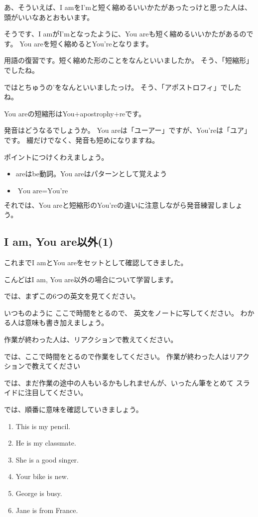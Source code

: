 \documentclass[book,jafontscale=0.9247]{jlreq}
\newcommand{\mySagyo}{%
\par%
\bigskip
では、ここで時間をとるので作業をしてください。
作業が終わった人はリアクションで教えてください\par%
\begin{minipage}[t]{.98\textwidth}
\mbox{}\hrulefill\mbox{}\par%
\mbox{}\hfill{}\raisebox{-.5\height}{作業}\hfill\mbox{}\par%
\mbox{}\hrulefill\mbox{}
\end{minipage}%
\par%
\bigskip%
では、まだ作業の途中の人もいるかもしれませんが、いったん筆をとめて
スライドに注目してください。%
\par%
\bigskip
}
\begin{document}
あ、そういえば、I amをI'mと短く縮めるいいかたがあったっけと思った人は、
頭がいいなあとおもいます。

そうです、I amがI'mとなったように、You areも短く縮めるいいかたがあるのです。
You areを短く縮めるとYou'reとなります。

用語の復習です。短く縮めた形のことをなんといいましたか。
そう、「短縮形」でしたね。

ではとちゅうの'をなんといいましたっけ。
そう、「ア{\gtfamily ポ}ストロフィ」でしたね。

You areの短縮形はYou$+$apostrophy$+$reです。

発音はどうなるでしょうか。
You areは「ユーアー」ですが、You'reは「ユア」です。
綴だけでなく、発音も短めになりますね。


ポイントにつけくわえましょう。

\begin{itemize}
 \item areはbe動詞。You areはパターンとして覚えよう
 \item {\gtfamily $\text{You are}=\text{You're}$}
\end{itemize}

それでは、You areと短縮形のYou'reの違いに注意しながら発音練習しましょう。
\newpage

\subsection{I am, You are以外(1)}
{\large \ComputerMouse}
これまでI amとYou areをセットとして確認してきました。

こんどはI am, You are以外の場合について学習します。


では、まずこの6つの英文を見てください。

いつものように
ここで時間をとるので、
英文をノートに写してください。
わかる人は意味も書き加えましょう。

作業が終わった人は、リアクションで教えてください。

\mySagyo

では、順番に意味を確認していきましょう。


\begin{enumerate}
 \item This is my pencil.
 \item He is my classmate.
 \item She is a good singer.
 \item Your bike is new.
 \item George is busy.
 \item Jane is from France.
\end{enumerate}
\end{document}
